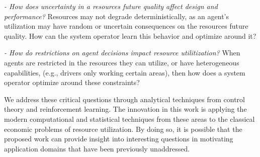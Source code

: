 \documentclass[letterpaper, 10 pt, conference]{ieeeconf}
\begin{document}
\noindent\textit{- How does uncertainty in a resources future quality affect design and performance?} Resources may not degrade deterministically, as an agent's utilization may have random or uncertain consequences on the resources future quality. How can the system operator learn this behavior and optimize around it?

\noindent\textit{- How do restrictions on agent decisions impact resource utilitization?} When agents are restricted in the resources they can utilize, or have heterogeneous capabilities, (e.g., drivers only working certain areas), then how does a system operator optimize around these constraints?

We address these critical questions through analytical techniques from control theory and reinforcement learning. The innovation in this work is applying the modern computational and statistical techniques from these areas to the classical economic problems of resource utilization. By doing so, it is possible that the proposed work can provide insight into interesting questions in motivating application domains that have been previously unaddressed. 
\end{document}
